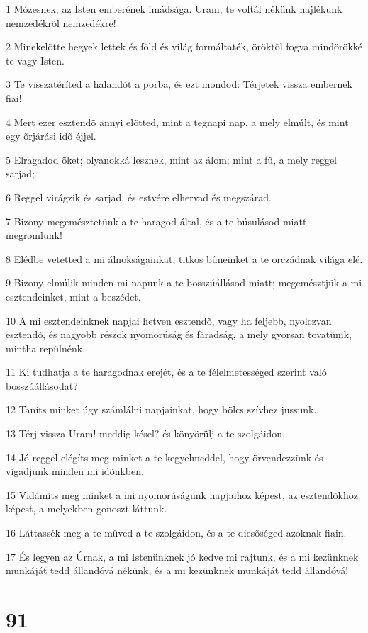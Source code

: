 \par 1 Mózesnek, az Isten emberének imádsága. Uram, te voltál nékünk hajlékunk nemzedékrõl nemzedékre!
\par 2 Minekelõtte hegyek lettek és föld és világ formáltaték, öröktõl fogva mindörökké te vagy Isten.
\par 3 Te visszatéríted a halandót a porba, és ezt mondod: Térjetek vissza embernek fiai!
\par 4 Mert ezer esztendõ annyi elõtted, mint a tegnapi nap, a mely elmúlt, és mint egy õrjárási idõ éjjel.
\par 5 Elragadod õket; olyanokká lesznek, mint az álom; mint a fû, a mely reggel sarjad;
\par 6 Reggel virágzik és sarjad, és estvére elhervad és megszárad.
\par 7 Bizony megemésztetünk a te haragod által, és a te búsulásod miatt megromlunk!
\par 8 Elédbe vetetted a mi álnokságainkat; titkos bûneinket a te orczádnak világa elé.
\par 9 Bizony elmúlik minden mi napunk a te bosszúállásod miatt; megemésztjük a mi esztendeinket, mint a beszédet.
\par 10 A mi esztendeinknek napjai hetven esztendõ, vagy ha feljebb, nyolczvan esztendõ, és nagyobb részök nyomorúság és fáradság, a mely gyorsan tovatünik, mintha repülnénk.
\par 11 Ki tudhatja a te haragodnak erejét, és a te félelmetességed szerint való bosszúállásodat?
\par 12 Taníts minket úgy számlálni napjainkat, hogy bölcs szívhez jussunk.
\par 13 Térj vissza Uram! meddig késel? és könyörülj a te szolgáidon.
\par 14 Jó reggel elégíts meg minket a te kegyelmeddel, hogy örvendezzünk és vígadjunk minden mi idõnkben.
\par 15 Vidámíts meg minket a mi nyomorúságunk napjaihoz képest, az esztendõkhöz képest, a melyekben gonoszt láttunk.
\par 16 Láttassék meg a te mûved a te szolgáidon, és a te dicsõséged azoknak fiain.
\par 17 És legyen az Úrnak, a mi Istenünknek jó kedve mi rajtunk, és a mi kezünknek munkáját tedd állandóvá nékünk, és a mi kezünknek munkáját tedd állandóvá!

\chapter{91}

